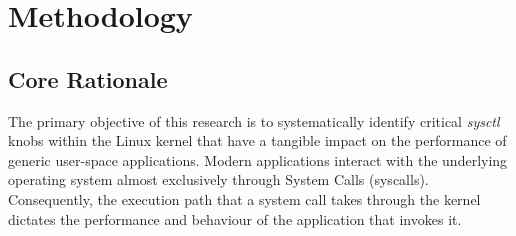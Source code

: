 \chapter{Methodology} \label{ch:methodology}


\section{Core Rationale}

The primary objective of this research is to systematically identify critical \textit{sysctl} knobs within the Linux kernel that have a tangible impact on the performance of generic user-space applications.
Modern applications interact with the underlying operating system almost exclusively through System Calls (syscalls).
Consequently, the execution path that a system call takes through the kernel dictates the performance and behaviour of the application that invokes it.

